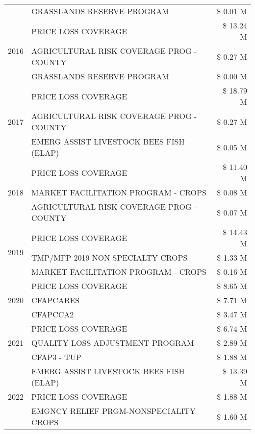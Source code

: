 \begin{tabular}{llr}
 & GRASSLANDS RESERVE PROGRAM & \$ 0.01 M \\
\cline{1-3}
\multirow[t]{3}{*}{2016} & PRICE LOSS COVERAGE & \$ 13.24 M \\
 & AGRICULTURAL RISK COVERAGE PROG - COUNTY & \$ 0.27 M \\
 & GRASSLANDS RESERVE PROGRAM & \$ 0.00 M \\
\cline{1-3}
\multirow[t]{3}{*}{2017} & PRICE LOSS COVERAGE & \$ 18.79 M \\
 & AGRICULTURAL RISK COVERAGE PROG - COUNTY & \$ 0.27 M \\
 & EMERG ASSIST LIVESTOCK BEES FISH (ELAP) & \$ 0.05 M \\
\cline{1-3}
\multirow[t]{3}{*}{2018} & PRICE LOSS COVERAGE & \$ 11.40 M \\
 & MARKET FACILITATION PROGRAM - CROPS & \$ 0.08 M \\
 & AGRICULTURAL RISK COVERAGE PROG - COUNTY & \$ 0.07 M \\
\cline{1-3}
\multirow[t]{3}{*}{2019} & PRICE LOSS COVERAGE & \$ 14.43 M \\
 & TMP/MFP 2019 NON SPECIALTY CROPS & \$ 1.33 M \\
 & MARKET FACILITATION PROGRAM - CROPS & \$ 0.16 M \\
\cline{1-3}
\multirow[t]{3}{*}{2020} & PRICE LOSS COVERAGE & \$ 8.65 M \\
 & CFAPCARES & \$ 7.71 M \\
 & CFAPCCA2 & \$ 3.47 M \\
\cline{1-3}
\multirow[t]{3}{*}{2021} & PRICE LOSS COVERAGE & \$ 6.74 M \\
 & QUALITY LOSS ADJUSTMENT PROGRAM & \$ 2.89 M \\
 & CFAP3 - TUP & \$ 1.88 M \\
\cline{1-3}
\multirow[t]{3}{*}{2022} & EMERG ASSIST LIVESTOCK BEES FISH (ELAP) & \$ 13.39 M \\
 & PRICE LOSS COVERAGE & \$ 1.88 M \\
 & EMGNCY RELIEF PRGM-NONSPECIALITY CROPS & \$ 1.60 M \\
\cline{1-3}
\bottomrule
\end{tabular}
